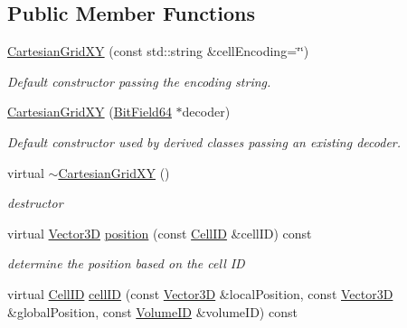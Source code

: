 \subsection*{Public Member Functions}
\begin{DoxyCompactItemize}
\item 
\hyperlink{class_d_d4hep_1_1_d_d_segmentation_1_1_cartesian_grid_x_y_a7fe8b00de8abcee4e8cbfc71b8ee6c32}{CartesianGridXY} (const std::string \&cellEncoding=\char`\"{}\char`\"{})
\begin{DoxyCompactList}\small\item\em Default constructor passing the encoding string. \item\end{DoxyCompactList}\item 
\hyperlink{class_d_d4hep_1_1_d_d_segmentation_1_1_cartesian_grid_x_y_a1df3c8a66b3c58d8d93ede3db742a5c6}{CartesianGridXY} (\hyperlink{class_d_d4hep_1_1_d_d_segmentation_1_1_bit_field64}{BitField64} $\ast$decoder)
\begin{DoxyCompactList}\small\item\em Default constructor used by derived classes passing an existing decoder. \item\end{DoxyCompactList}\item 
virtual \hyperlink{class_d_d4hep_1_1_d_d_segmentation_1_1_cartesian_grid_x_y_aeaad4807131cbd3536718b66a0a76b0d}{$\sim$CartesianGridXY} ()
\begin{DoxyCompactList}\small\item\em destructor \item\end{DoxyCompactList}\item 
virtual \hyperlink{struct_d_d4hep_1_1_d_d_segmentation_1_1_vector3_d}{Vector3D} \hyperlink{class_d_d4hep_1_1_d_d_segmentation_1_1_cartesian_grid_x_y_a2a7d50d0a59d37116654b0f6a691f945}{position} (const \hyperlink{namespace_d_d4hep_1_1_d_d_segmentation_ac7af071d85cb48820914434a07e21ba1}{CellID} \&cellID) const 
\begin{DoxyCompactList}\small\item\em determine the position based on the cell ID \item\end{DoxyCompactList}\item 
virtual \hyperlink{namespace_d_d4hep_1_1_d_d_segmentation_ac7af071d85cb48820914434a07e21ba1}{CellID} \hyperlink{class_d_d4hep_1_1_d_d_segmentation_1_1_cartesian_grid_x_y_ac7de84f02aa18034f60f6319982ac4e3}{cellID} (const \hyperlink{struct_d_d4hep_1_1_d_d_segmentation_1_1_vector3_d}{Vector3D} \&localPosition, const \hyperlink{struct_d_d4hep_1_1_d_d_segmentation_1_1_vector3_d}{Vector3D} \&globalPosition, const \hyperlink{namespace_d_d4hep_1_1_d_d_segmentation_a61a6833a18d1800bdef176595f83e3ba}{VolumeID} \&volumeID) const 

\end{DoxyCompactItemize}
